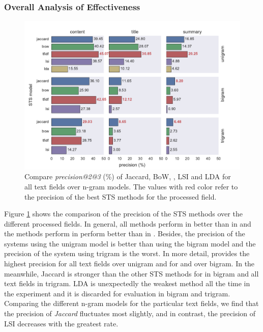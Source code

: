 \subsubsection{Overall Analysis of Effectiveness}

\begin{figure}[!htb]
    \centering
    \includegraphics[width=\textwidth]{fig/precision_2_3}
    \caption[Compare \textit{precision@2@3} (\%) of Jaccard, BoW, \tfidf{}, LSI and LDA for all text fields over n-gram models.]{Compare \textit{precision@2@3} (\%) of Jaccard, BoW, \tfidf{}, LSI and LDA for all text fields over n-gram models. The values with red color refer to the precision of the best STS methods for the processed field. }
    \label{fig:precision_2_3}
\end{figure}

Figure \ref{fig:precision_2_3} shows the comparison of the precision of the STS methods over the different processed fields. In general, all methods perform in \icontent{} better than in \ititle{} and the methods perform in \ititle{} perform better than in \isummary{}. Besides, the precision of the systems using the unigram model is better than using the bigram model and the precision of the system using trigram is the worst. In more detail, \tfidf{} provides the highest precision for all text fields over unigram and for \icontent{} and \ititle{} over bigram. In the meanwhile, Jaccard is stronger than the other STS methods for \isummary{} in bigram and all text fields in trigram. LDA is unexpectedly the weakest method all the time in the experiment and it is discarded for evaluation in bigram and trigram. Comparing the different n-gram models for the particular text fields, we find that the precision of \textit{Jaccard} fluctuates most slightly, and in contrast, the precision of LSI decreases with the greatest rate. 

